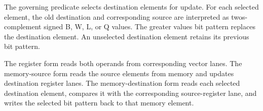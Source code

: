 The governing predicate selects destination elements for update. For each
selected element, the old destination and corresponding source are interpreted
as two\textquotesingle{}s-complement signed B, W, L, or Q values. The greater value\textquotesingle{}s bit pattern
replaces the destination element. An unselected destination element retains its
previous bit pattern.

The register form reads both operands from corresponding vector lanes. The
memory-source form reads the source elements from memory and updates destination
register lanes. The memory-destination form reads each selected destination
element, compares it with the corresponding source-register lane, and writes
the selected bit pattern back to that memory element.
